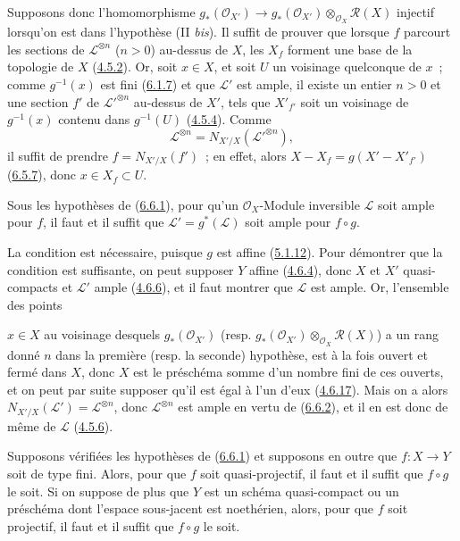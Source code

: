 Supposons donc l'homomorphisme
$g_*(\mathcal{O}_{X'})\to
g_*(\mathcal{O}_{X'})\otimes_{\mathcal{O}_X}\mathcal{R}(X)$ injectif
lorsqu'on est dans l'hypothèse (II \emph{bis}). Il suffit de prouver que
lorsque $f$ parcourt les sections de $\mathcal{L}^{\otimes n}$ ($n>0$)
au-dessus de $X$, les $X_f$ forment une base de la topologie de $X$
(\hyperref[II.4.5.2-fr]{4.5.2}). Or, soit $x\in X$, et soit $U$ un voisinage
quelconque de $x$~; comme $g^{-1}(x)$ est fini
(\hyperref[II.6.1.7-fr]{6.1.7}) et que $\mathcal{L}'$ est ample, il existe un
entier $n>0$ et une section $f'$ de ${\mathcal{L}'}^{\otimes n}$ au-dessus de
$X'$, tels que $X'_{f'}$ soit un voisinage de $g^{-1}(x)$ contenu dans
$g^{-1}(U)$ (\hyperref[II.4.5.4-fr]{4.5.4}). Comme
\[
\mathcal{L}^{\otimes n}=N_{X'/X}({\mathcal{L}'}^{\otimes n}),
\]
il suffit de prendre $f=N_{X'/X}(f')$~; en effet, alors
$X-X_f=g(X'-X'_{f'})$ (\hyperref[II.6.5.7-fr]{6.5.7}), donc
$x\in X_f\subset U$.

\begin{corollary}[6.6.3]
\label{II.6.6.3-fr}
Sous les hypothèses de (\hyperref[II.6.6.1-fr]{6.6.1}), pour qu'un
$\mathcal{O}_X$-Module inversible $\mathcal{L}$ soit ample pour $f$, il faut
et il suffit que $\mathcal{L}'=g^*(\mathcal{L})$ soit ample pour $f\circ g$.
\end{corollary}

La condition est nécessaire, puisque $g$ est affine
(\hyperref[II.5.1.12-fr]{5.1.12}). Pour démontrer que la condition est
suffisante, on peut supposer $Y$ affine (\hyperref[II.4.6.4-fr]{4.6.4}), donc
$X$ et $X'$ quasi-compacts et $\mathcal{L}'$ ample
(\hyperref[II.4.6.6-fr]{4.6.6}), et il faut montrer que $\mathcal{L}$ est
ample. Or, l'ensemble des points


$x\in X$ au voisinage desquels $g_*(\mathcal{O}_{X'})$ (resp.
$g_*(\mathcal{O}_{X'})\otimes_{\mathcal{O}_X}\mathcal{R}(X)$) a un rang
donné $n$ dans la première (resp. la seconde) hypothèse, est à la fois ouvert
et fermé dans $X$, donc $X$ est le préschéma somme d'un nombre fini de ces
ouverts, et on peut par suite supposer qu'il est égal à l'un d'eux
(\hyperref[II.4.6.17-fr]{4.6.17}). Mais on a alors
$N_{X'/X}(\mathcal{L}')=\mathcal{L}^{\otimes n}$, donc
$\mathcal{L}^{\otimes n}$ est ample en vertu de
(\hyperref[II.6.6.2-fr]{6.6.2}), et il en est donc de même de $\mathcal{L}$
(\hyperref[II.4.5.6-fr]{4.5.6}).

\begin{corollary}[6.6.4]
\label{II.6.6.4-fr}
Supposons vérifiées les hypothèses de
(\hyperref[II.6.6.1-fr]{6.6.1}) et supposons en outre que
$f:X\to Y$ soit de type fini. Alors, pour que $f$ soit quasi-projectif, il
faut et il suffit que $f\circ g$ le soit. Si on suppose de plus que $Y$ est
un schéma quasi-compact ou un préschéma dont l'espace sous-jacent est
noethérien, alors, pour que $f$ soit projectif, il faut et il suffit que
$f\circ g$ le soit.
\end{corollary}

